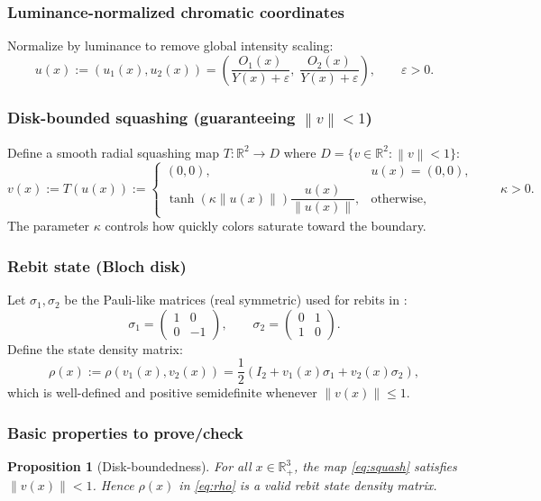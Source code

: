 \documentclass[11pt]{article}
\newtheorem{proposition}{Proposition}
\newcommand{\R}{\mathbb{R}}
\newcommand{\Rp}{\R_{+}}
\newcommand{\norm}[1]{\left\lVert #1 \right\rVert}
\begin{document}
\subsubsection{Luminance-normalized chromatic coordinates}
Normalize by luminance to remove global intensity scaling:
\begin{equation}\label{eq:u}
u(x) := (u_1(x),u_2(x))
= \left(
\frac{O_1(x)}{Y(x)+\varepsilon},\;
\frac{O_2(x)}{Y(x)+\varepsilon}
\right),
\qquad \varepsilon>0.
\end{equation}

\subsubsection{Disk-bounded squashing (guaranteeing $\norm{v}<1$)}
Define a smooth radial squashing map $T:\R^2\to D$ where $D=\{v\in\R^2:\norm{v}<1\}$:
\begin{equation}\label{eq:squash}
v(x) := T(u(x)) :=
\begin{cases}
(0,0), & u(x)=(0,0),\\[0.35em]
\tanh(\kappa\norm{u(x)})\dfrac{u(x)}{\norm{u(x)}}, & \text{otherwise},
\end{cases}
\qquad \kappa>0.
\end{equation}
The parameter $\kappa$ controls how quickly colors saturate toward the boundary.

\subsubsection{Rebit state (Bloch disk)}
Let $\sigma_1,\sigma_2$ be the Pauli-like matrices (real symmetric) used for rebits in \cite{Berthier2020}:
\begin{equation}
\sigma_1=\begin{pmatrix}1&0\\0&-1\end{pmatrix},\qquad
\sigma_2=\begin{pmatrix}0&1\\1&0\end{pmatrix}.
\end{equation}
Define the state density matrix:
\begin{equation}\label{eq:rho}
\rho(x):=\rho(v_1(x),v_2(x))
=\frac12\left(I_2+v_1(x)\sigma_1+v_2(x)\sigma_2\right),
\end{equation}
which is well-defined and positive semidefinite whenever $\norm{v(x)}\le 1$.

\subsubsection{Basic properties to prove/check}
\begin{proposition}[Disk-boundedness]
For all $x\in\Rp^3$, the map \eqref{eq:squash} satisfies $\norm{v(x)}<1$. Hence $\rho(x)$ in \eqref{eq:rho} is a valid rebit state density matrix.
\end{proposition}
\end{document}
